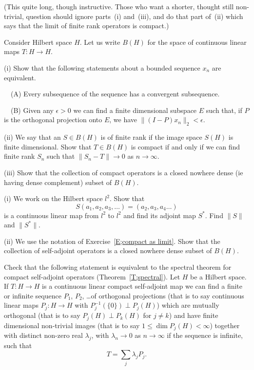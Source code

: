 \begin{exercise}\label{E;compact as limit}\label{C4.7} 
(This quite long, though instructive. Those who want a shorter,
thought still non-trivial, question should ignore parts~(i)
and~(iii), and
do that part of~(ii) which says that the limit of finite rank operators
is compact.)

Consider
Hilbert space $H$. 
Let us write
$B(H)$ for the space of continuous linear maps
$T:H\rightarrow H$.

(i) Show that the following statements about
a bounded sequence $x_{n}$ are equivalent.

\ \ (A) Every subsequence of the sequence has a convergent 
subsequence.

\ \ (B) Given any $\epsilon>0$ we can find a finite 
dimensional subspace $E$ such that, if $P$ is the orthogonal
projection onto $E$, we have $\|(I-P)x_{n}\|_{2}<\epsilon$. 

(ii) We say that an $S\in B(H)$ is of finite rank if
the image space $S(H)$ is finite  dimensional.
Show that $T\in B(H)$ is compact if and only if
we can find finite rank $S_{n}$ such that
$\|S_{n}-T\|\rightarrow 0$ as $n\rightarrow\infty$.


(iii) Show that the collection of compact operators is a closed
nowhere dense (ie having dense complement)
subset of $B(H)$.
\end{exercise}
\begin{exercise}\label{C4.8} 
(i) We work on the Hilbert space $l^{2}$. Show that
\[S(a_{1},a_{2},a_{3},\dots)=(a_{2},a_{3},a_{4}\dots)\]
is a continuous linear map from $l^{2}$ to $l^{2}$
and find its adjoint map $S^{*}$. Find $\|S\|$ and $\|S^{*}\|$.

(ii) We use the notation of Exercise~\ref{E;compact as limit}.
Show that the collection of self-adjoint operators is a closed
nowhere dense subset of $B(H)$.
\end{exercise}
\begin{exercise}\label{E;spectral projection}\label{C4.9} 
Check that the following statement is equivalent to the spectral
theorem for compact self-adjoint operators
(Theorem~\ref{T;spectral}).
Let $H$ be a Hilbert space. If
$T:H\rightarrow H$ is a continuous linear compact self-adjoint map
we can find a finite or infinite sequence $P_{1}$, $P_{2}$,
\dots of orthogonal projections (that is to say
continuous linear maps $P_{j}:H\rightarrow H$ with
$P_{j}^{-1}(\{0\})\perp P_{j}(H)$) which are mutually
orthogonal
(that is to say $P_{j}(H)\perp P_{k}(H)$ for $j\neq k$)
and have finite dimensional non-trivial images (that is to say
$1\leq \dim P_{j}(H)<\infty$) together with
distinct non-zero real $\lambda_{j}$, with
$\lambda_{n}\rightarrow 0$ as $n\rightarrow\infty$
if the sequence is infinite, such that
\[T=\sum_{j}\lambda_{j}P_{j}.\]

\end{exercise}
